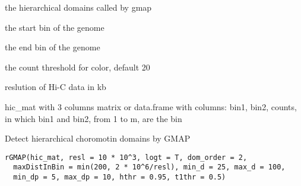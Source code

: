 \documentclass[a4paper]{book}
\begin{document}
\begin{Arguments}
\begin{ldescription}
\item[\code{hiertads\_gmap}] the hierarchical domains called by gmap

\item[\code{start\_bin}] the start bin of the genome

\item[\code{end\_bin}] the end bin of the genome

\item[\code{cthr}] the count threshold for color, default 20

\item[\code{kb\_resl}] reslution of Hi-C data in kb

\item[\code{hic\_mat}] hic\_mat with 3 columns
matrix or data.frame with columns: bin1, bin2, counts, in which bin1 and bin2, from 1 to m, are the bin
\end{ldescription}
\end{Arguments}
%
\begin{Description}\relax
Detect hierarchical choromotin domains by GMAP
\end{Description}
%
\begin{Usage}
\begin{verbatim}
rGMAP(hic_mat, resl = 10 * 10^3, logt = T, dom_order = 2,
  maxDistInBin = min(200, 2 * 10^6/resl), min_d = 25, max_d = 100,
  min_dp = 5, max_dp = 10, hthr = 0.95, t1thr = 0.5)
\end{verbatim}
\end{Usage}
%
\end{document}
